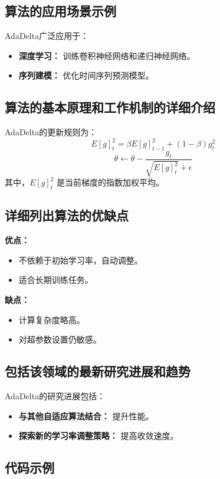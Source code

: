 \subsection*{算法的应用场景示例}
AdaDelta广泛应用于：
\begin{itemize}
    \item \textbf{深度学习：} 训练卷积神经网络和递归神经网络。
    \item \textbf{序列建模：} 优化时间序列预测模型。
\end{itemize}

\subsection*{算法的基本原理和工作机制的详细介绍}
AdaDelta的更新规则为：
\[
    E[g]^2_t = \beta E[g]^2_{t-1} + (1 - \beta) g_t^2
\]
\[
    \theta \leftarrow \theta - \frac{g_t}{\sqrt{E[g]^2_t} + \epsilon}
\]
其中，\(E[g]^2_t\) 是当前梯度的指数加权平均。

\subsection*{详细列出算法的优缺点}
\textbf{优点：}
\begin{itemize}
    \item 不依赖于初始学习率，自动调整。
    \item 适合长期训练任务。
\end{itemize}

\textbf{缺点：}
\begin{itemize}
    \item 计算复杂度略高。
    \item 对超参数设置仍敏感。
\end{itemize}

\subsection*{包括该领域的最新研究进展和趋势}
AdaDelta的研究进展包括：
\begin{itemize}
    \item \textbf{与其他自适应算法结合：} 提升性能。
    \item \textbf{探索新的学习率调整策略：} 提高收敛速度。
\end{itemize}
\subsection*{代码示例}
\begin{lstlisting}

\end{lstlisting}


